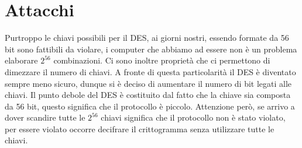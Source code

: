 \section{Attacchi}

Purtroppo le chiavi possibili per il DES, ai giorni nostri, essendo formate da 56 bit sono fattibili da violare, i computer che abbiamo ad essere non è un problema elaborare $2^{56}$ combinazioni. Ci sono inoltre proprietà che ci permettono di dimezzare il numero di chiavi. A fronte di questa particolarità il DES è diventato sempre meno sicuro, dunque si è deciso di aumentare il numero di bit legati alle chiavi. Il punto debole del DES è costituito dal fatto che la chiave sia composta da 56 bit, questo significa che il protocollo è piccolo. Attenzione però, se arrivo a dover scandire tutte le $2^{56}$ chiavi significa che il protocollo non è stato violato, per essere violato occorre decifrare il crittogramma senza utilizzare tutte le chiavi.